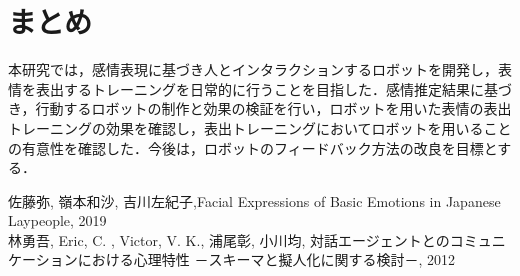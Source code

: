\documentclass[twocolumn,a4j]{jarticle}
\begin{document}
\section{まとめ}
\vspace{-2mm}
本研究では，感情表現に基づき人とインタラクションするロボットを開発し，表情を表出するトレーニングを日常的に行うことを目指した．感情推定結果に基づき，行動するロボットの制作と効果の検証を行い，ロボットを用いた表情の表出トレーニングの効果を確認し，表出トレーニングにおいてロボットを用いることの有意性を確認した．今後は，ロボットのフィードバック方法の改良を目標とする．
\vspace{-9mm}
\begin{thebibliography}{9}\setlength{\itemsep}{-2pt}
\vspace{-2mm}
佐藤弥, 嶺本和沙, 吉川左紀子,Facial Expressions of Basic Emotions in Japanese Laypeople, 2019\\
\vspace{-6mm}
林勇吾, Eric, C. , Victor, V. K., 浦尾彰, 小川均, 対話エージェントとのコミュニケーションにおける心理特性 －スキーマと擬人化に関する検討－, 2012\\
\end{thebibliography}
\end{document}
